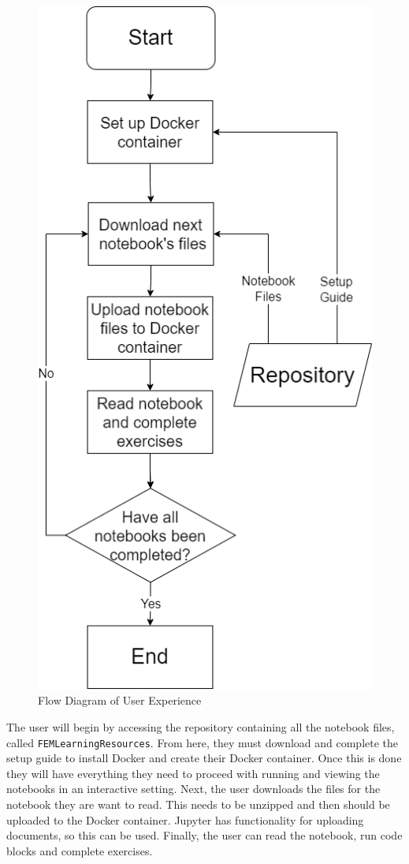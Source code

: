 \begin{figure}[h]
\centering
\includegraphics[scale=0.25]{user_experience.drawio}
\caption{Flow Diagram of User Experience} \label{fig:user-experience}
\end{figure}

The user will begin by accessing the repository containing all the notebook files, called \texttt{FEMLearningResources}. From here, they must download and complete the setup guide to install Docker and create their Docker container. Once this is done they will have everything they need to proceed with running and viewing the notebooks in an interactive setting. Next, the user downloads the files for the notebook they are want to read. This needs to be unzipped and then should be uploaded to the Docker container. Jupyter has functionality for uploading documents, so this can be used. Finally, the user can read the notebook, run code blocks and complete exercises.

